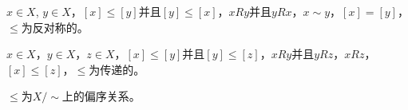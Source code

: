 \documentclass{beamer}
\begin{document}
\begin{CJK*}{UTF8}{gbsn}
\begin{frame}
  $x\in X$, \pause$y\in X$，$[x]\leq [y]$并且$[y]\leq [x]$，$xRy$并且$yRx$，$x\sim y$，$[x]=[y]$，$\leq$为反对称的。

  $x\in X$，\pause$y\in X$，\pause$z\in X$，$[x] \leq [y]$并且$[y] \leq [z]$，$xRy$并且$yRz$，$xRz$，$[x]\leq [z]$，$\leq$为传递的。

  $\leq$为$X/\sim$上的偏序关系。

\end{frame}


   


\end{CJK*}
\end{document}
